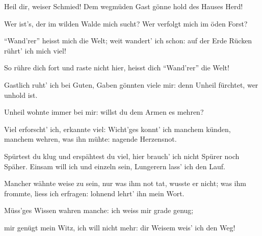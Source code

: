 \begin{drama}
\Wandererspeaks

Heil dir, weiser Schmied!
Dem wegmüden Gast
gönne hold
des Hauses Herd!

\Mimespeaks


Wer ist's, der im wilden
Walde mich sucht?
Wer verfolgt mich im öden Forst?

\Wandererspeaks


``Wand'rer'' heisst mich die Welt;
weit wandert' ich schon:
auf der Erde Rücken
rührt' ich mich viel!

\Mimespeaks

So rühre dich fort
und raste nicht hier,
heisst dich ``Wand'rer'' die Welt!

\Wandererspeaks

Gastlich ruht' ich bei Guten,
Gaben gönnten viele mir:
denn Unheil fürchtet,
wer unhold ist.

\Mimespeaks

Unheil wohnte
immer bei mir:
willst du dem Armen es mehren?

\Wandererspeaks


Viel erforscht' ich,
erkannte viel:
Wicht'ges konnt' ich
manchem künden,
manchem wehren,
was ihn mühte:
nagende Herzensnot.

\Mimespeaks

Spürtest du klug
und erspähtest du viel,
hier brauch' ich nicht Spürer noch Späher.
Einsam will ich
und einzeln sein,
Lungerern lass' ich den Lauf.

\Wandererspeaks


Mancher wähnte
weise zu sein,
nur was ihm not tat,
wusste er nicht;
was ihm frommte,
liess ich erfragen:
lohnend lehrt' ihn mein Wort.

\Mimespeaks


Müss'ges Wissen
wahren manche:
ich weiss mir grade genug;


mir genügt mein Witz,
ich will nicht mehr:
dir Weisem weis' ich den Weg!

\Wandererspeaks


\end{drama}
